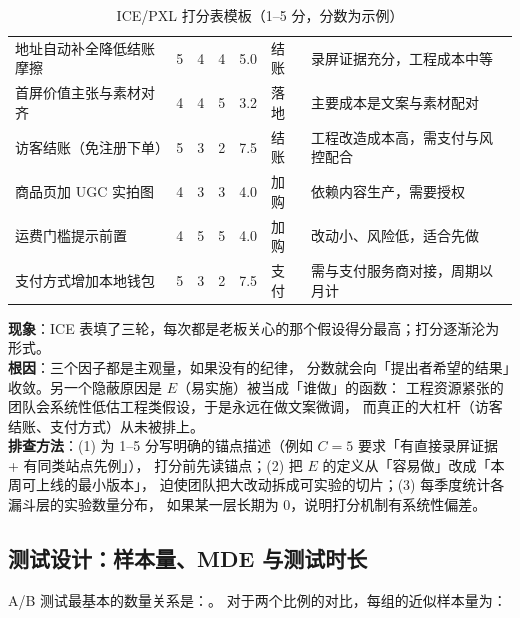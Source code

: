 \begin{table}[htbp]
\centering
\caption{ICE/PXL 打分表模板（1--5 分，分数为示例）}
\label{tab:ice}
\small
\begin{tabularx}{\textwidth}{L{3.4cm} C{0.9cm} C{0.9cm} C{0.9cm} C{1.0cm} C{1.5cm} Y}
\toprule
{} &  &  &  &  &  &  \\
\midrule
地址自动补全降低结账摩擦 & 5 & 4 & 4 & 5.0 & 结账 & 录屏证据充分，工程成本中等 \\
首屏价值主张与素材对齐 & 4 & 4 & 5 & 3.2 & 落地 & 主要成本是文案与素材配对 \\
访客结账（免注册下单） & 5 & 3 & 2 & 7.5 & 结账 & 工程改造成本高，需支付与风控配合 \\
商品页加 UGC 实拍图 & 4 & 3 & 3 & 4.0 & 加购 & 依赖内容生产，需要授权 \\
运费门槛提示前置 & 4 & 5 & 5 & 4.0 & 加购 & 改动小、风险低，适合先做 \\
支付方式增加本地钱包 & 5 & 3 & 2 & 7.5 & 支付 & 需与支付服务商对接，周期以月计 \\
\bottomrule
\end{tabularx}
\end{table}

\begin{pitfall}
\textbf{现象}：ICE 表填了三轮，每次都是老板关心的那个假设得分最高；打分逐渐沦为形式。\\
\textbf{根因}：三个因子都是主观量，如果没有的纪律，
分数就会向「提出者希望的结果」收敛。另一个隐蔽原因是 $E$（易实施）被当成「谁做」的函数：
工程资源紧张的团队会系统性低估工程类假设，于是永远在做文案微调，
而真正的大杠杆（访客结账、支付方式）从未被排上。\\
\textbf{排查方法}：(1) 为 1--5 分写明确的锚点描述（例如 $C=5$ 要求「有直接录屏证据 + 有同类站点先例」），
打分前先读锚点；(2) 把 $E$ 的定义从「容易做」改成「本周可上线的最小版本」，
迫使团队把大改动拆成可实验的切片；(3) 每季度统计各漏斗层的实验数量分布，
如果某一层长期为 0，说明打分机制有系统性偏差。
\end{pitfall}

\subsection{测试设计：样本量、MDE 与测试时长}

A/B 测试最基本的数量关系是：。
对于两个比例的对比，每组的近似样本量为：

